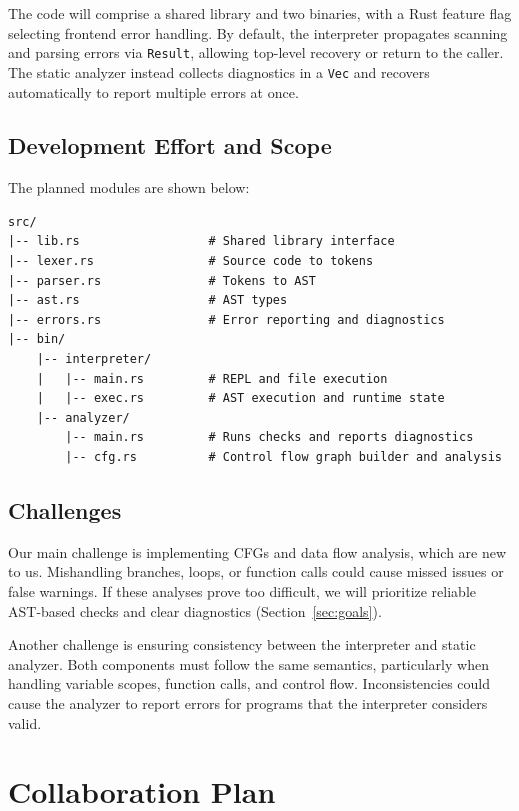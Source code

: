 \documentclass{article}
\begin{document}
The code will comprise a shared library and two binaries, with a Rust feature
flag selecting frontend error handling. By default, the interpreter propagates
scanning and parsing errors via \texttt{Result}, allowing top-level recovery
or return to the caller. The static analyzer instead collects diagnostics in
a \texttt{Vec} and recovers automatically to report multiple errors at once.

\subsection{Development Effort and Scope}
The planned modules are shown below:
\begin{center}
\begin{BVerbatim}[fontsize=\small]
src/
|-- lib.rs                  # Shared library interface
|-- lexer.rs                # Source code to tokens
|-- parser.rs               # Tokens to AST
|-- ast.rs                  # AST types
|-- errors.rs               # Error reporting and diagnostics
|-- bin/
    |-- interpreter/
    |   |-- main.rs         # REPL and file execution
    |   |-- exec.rs         # AST execution and runtime state
    |-- analyzer/
        |-- main.rs         # Runs checks and reports diagnostics
        |-- cfg.rs          # Control flow graph builder and analysis
\end{BVerbatim}
\end{center}

\subsection{Challenges}
Our main challenge is implementing CFGs and data flow analysis, which are new
to us. Mishandling branches, loops, or function calls could cause missed issues
or false warnings. If these analyses prove too difficult, we will prioritize
reliable AST-based checks and clear diagnostics (Section~\ref{sec:goals}).

Another challenge is ensuring consistency between the interpreter and static
analyzer. Both components must follow the same semantics, particularly when
handling variable scopes, function calls, and control flow. Inconsistencies
could cause the analyzer to report errors for programs that the interpreter
considers valid.

\section{Collaboration Plan}
\end{document}
